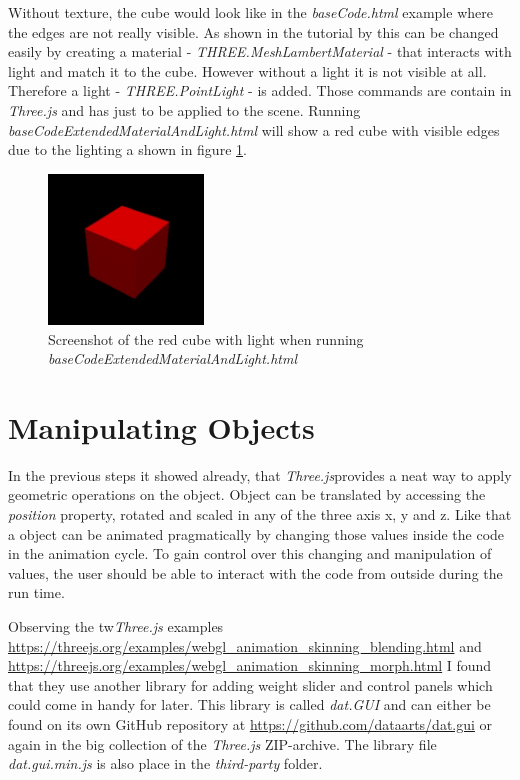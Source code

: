 Without texture, the cube would look like in the \textit{baseCode.html} example where the edges are not really visible. As shown in the tutorial by \cite{Lewis2012AerotwistThree.js} this can be changed easily by creating a material - \textit{THREE.MeshLambertMaterial} - that interacts with light and match it to the cube. However without a light it is not visible at all. Therefore a light - \textit{THREE.PointLight} - is added. Those commands are contain in \textit{Three.js} and has just to be applied to the scene. Running \mbox{\textit{baseCodeExtendedMaterialAndLight.html}} will show a red cube with visible edges due to the lighting a shown in figure \ref{fig:red cube}.

\begin{figure}[h]
    \centering
    \includegraphics[height=4cm]{Document/Figures/chapter2/ScreenshotRedCubeWithLight.jpg}
    \caption[Screenshot of the red cube with light]{Screenshot of the red cube with light when  running \mbox{\textit{baseCodeExtendedMaterialAndLight.html}}}
    \label{fig:red cube}
\end{figure}

\section{Manipulating Objects}
\label{sec:Manipulating Objects}

In the previous steps it showed already, that \textit{Three.js}provides a neat way to apply geometric operations on the object. Object can be translated by accessing the \textit{position} property, rotated and scaled in any of the three axis x, y and z. Like that a object can be animated pragmatically by changing those values inside the code in the animation cycle. To gain control over this changing and manipulation of values, the user should be able to interact with the code from outside during the run time. 

Observing the tw\textit{Three.js} examples \url{https://threejs.org/examples/webgl_animation_skinning_blending.html} and \url{https://threejs.org/examples/webgl_animation_skinning_morph.html} I found that they use another library for adding weight slider and control panels which could come in handy for later. This library is called \textit{dat.GUI} and can either be found on its own GitHub repository at \url{https://github.com/dataarts/dat.gui} or again in the big collection of the \textit{Three.js} ZIP-archive. The library file \textit{dat.gui.min.js} is also place in the \textit{third-party} folder.

